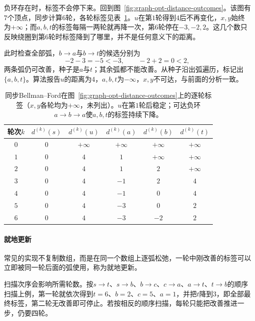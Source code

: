 负环存在时，标签不会停下来。回到图~\ref{fig:graph-opt-distance-outcomes}。该图有$7$个顶点，同步计算$6$轮，各轮标签见表~\ref{tab:graph-opt-bellman-ford-negative}。$u$在第$1$轮得到$4$后不再变化，$x,y$始终为$+\infty$；而$a,b,t$的标签每隔一两轮就再降一次，第$6$轮停在$-3,-2,2$。这几个数只反映绕圈到第$6$轮时标签降到了哪里，并不是任何意义下的距离。

此时检查全部弧，$b\to a$与$b\to t$的候选分别为
\[
  -2-3=-5<-3,\qquad -2+2=0<2,
\]
两条弧仍可改善，种子是$a$与$t$；其余弧都不能改善。从种子沿出弧遍历，标记出$\{a,b,t\}$。算法报告$u$的距离为$4$，$a,b,t$为$-\infty$，$x,y$不可达，与前面的分析一致。

\begin{table}[!htb]
  \centering
  \begin{tabular}{cccccc}
    \toprule
    轮次$k$ & $d^{(k)}(s)$ & $d^{(k)}(u)$ & $d^{(k)}(a)$ & $d^{(k)}(b)$ & $d^{(k)}(t)$ \\
    \midrule
    $0$ & $0$ & $+\infty$ & $+\infty$ & $+\infty$ & $+\infty$ \\
    $1$ & $0$ & $4$ & $1$ & $+\infty$ & $+\infty$ \\
    $2$ & $0$ & $4$ & $1$ & $2$ & $+\infty$ \\
    $3$ & $0$ & $4$ & $-1$ & $2$ & $4$ \\
    $4$ & $0$ & $4$ & $-1$ & $0$ & $4$ \\
    $5$ & $0$ & $4$ & $-3$ & $0$ & $2$ \\
    $6$ & $0$ & $4$ & $-3$ & $-2$ & $2$ \\
    \bottomrule
  \end{tabular}
  \caption{同步Bellman--Ford在图~\ref{fig:graph-opt-distance-outcomes}上的逐轮标签（$x,y$各轮均为$+\infty$，未列出）。$u$在第$1$轮后稳定；可达负环$a\to b\to a$使$a,b,t$的标签持续下降。}
  \label{tab:graph-opt-bellman-ford-negative}
\end{table}

\paragraph{就地更新}
常见的实现不复制数组，而是在同一个数组上逐弧松弛，一轮中刚改善的标签可以立即被同一轮后面的弧使用，称为就地更新。

扫描次序会影响所需轮数。按$s\to t$、$s\to b$、$b\to c$、$c\to a$、$a\to t$、$t\to b$的顺序扫描上例，第一轮就依次得到$t=6$、$b=2$、$c=5$、$a=1$，并把$t$降到$3$，即全部最终标签，第二轮无改善即可停止。若按相反的顺序扫描，每轮只能把改善推进一步，仍要四轮。


